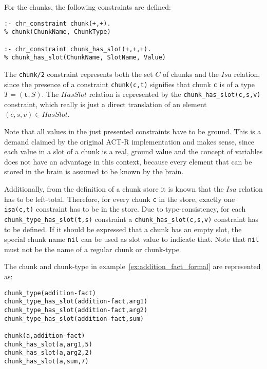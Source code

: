 For the chunks, the following constraints are defined:

\begin{lstlisting}
:- chr_constraint chunk(+,+).
% chunk(ChunkName, ChunkType)

:- chr_constraint chunk_has_slot(+,+,+).
% chunk_has_slot(ChunkName, SlotName, Value)
\end{lstlisting}

The \lstinline|chunk/2| constraint represents both the set $C$ of chunks and the $Isa$ relation, since the presence of a constraint \lstinline|chunk(c,t)| signifies that chunk \lstinline|c| is of a type $T = (\mathtt{t},S)$. The $HasSlot$ relation is represented by the \lstinline|chunk_has_slot(c,s,v)| constraint, which really is just a direct translation of an element $(c,s,v) \in HasSlot$.

Note that all values in the just presented constraints have to be ground. This is a demand claimed by the original ACT-R implementation and makes sense, since each value in a slot of a chunk is a real, ground value and the concept of variables does not have an advantage in this context, because every element that can be stored in the brain is assumed to be known by the brain.

Additionally, from the definition of a chunk store it is known that the $Isa$ relation has to be left-total. Therefore, for every chunk \lstinline|c| in the store, exactly one \lstinline|isa(c,t)| constraint has to be in the store. Due to type-consistency, for each \lstinline|chunk_type_has_slot(t,s)| constraint a \lstinline|chunk_has_slot(c,s,v)| constraint has to be defined. If it should be expressed that a chunk has an empty slot, the special chunk name \lstinline|nil| can be used as slot value to indicate that. Note that \lstinline|nil| must not be the name of a regular chunk or chunk-type.

\begin{example}
\label{ex:addition_fact_chr}
The chunk and chunk-type in example~\ref{ex:addition_fact_formal} are represented as:

\begin{lstlisting}
chunk_type(addition-fact)
chunk_type_has_slot(addition-fact,arg1)
chunk_type_has_slot(addition-fact,arg2)
chunk_type_has_slot(addition-fact,sum)

chunk(a,addition-fact)
chunk_has_slot(a,arg1,5)
chunk_has_slot(a,arg2,2)
chunk_has_slot(a,sum,7)
\end{lstlisting}
\end{example}


